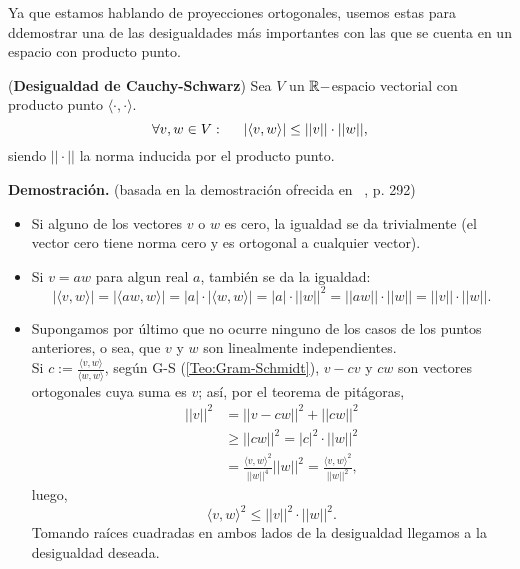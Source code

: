 \noindent Ya que estamos hablando de proyecciones ortogonales,
usemos estas para ddemostrar
una de las desigualdades
más importantes con las que se cuenta en un espacio
con producto punto.

\begin{teo}
(\textbf{Desigualdad de Cauchy-Schwarz}) \label{Teo:CauchySchwarz}
Sea $V$ un $\mathbb{R}-$espacio vectorial con producto punto 
$ \langle \cdot  , \cdot  \rangle$.
\begin{equation}
\label{eq0: 12Feb}
\forall v , w \in V : \hspace{0.5cm}
|\langle  v , w \rangle | \leq ||v|| \cdot ||w||,
\end{equation}
siendo $|| \cdot ||$
la norma inducida por el producto punto.
\end{teo}
\noindent
\textbf{Demostración.}
(basada en la demostración
ofrecida en ~\cite{Lang}, p. 292)
\begin{itemize}
\item Si alguno de los vectores $v$ o $w$ es cero,
la igualdad se da trivialmente (el vector cero tiene norma
cero y es ortogonal a cualquier vector). 

\item Si $v=a w$ para algun real $a$, también se 
da la igualdad:
\[
|\langle  v , w \rangle | =
|\langle  aw , w \rangle | = |a| \cdot  |\langle  w , w \rangle | =  
 |a| \cdot ||w||^{2}
=||aw|| \cdot ||w|| = ||v|| \cdot ||w||.
\]
\item Supongamos por último que no ocurre ninguno
de los casos de los puntos anteriores, o sea, que
$v$ y $w$ son linealmente independientes. \\
Si $c:=\frac{\langle v , w \rangle}{\langle w , w \rangle}$,
según G-S (\ref{Teo:Gram-Schmidt}), 
$v-cv$ y $cw$ son vectores ortogonales cuya suma es $v$;
así, por el teorema de pitágoras,
\begin{align*}
||v||^{2} & = ||v-cw||^{2} + ||cw||^{2} \\
& \geq ||cw||^{2}= |c|^{2} \cdot ||w||^{2} \\
& = \frac{\langle v , w \rangle ^{2}}{||w||^{4}}||w||^{2}
= \frac{\langle v , w \rangle ^{2}}{||w||^{2}},
\end{align*}
luego, 
\[
\langle  v , w \rangle ^{2}  \leq ||v||^{2} \cdot ||w||^{2}.
\]
Tomando raíces cuadradas en ambos lados de la
desigualdad llegamos a la desigualdad deseada. \QEDB
\end{itemize}
\vspace{0.2cm}


